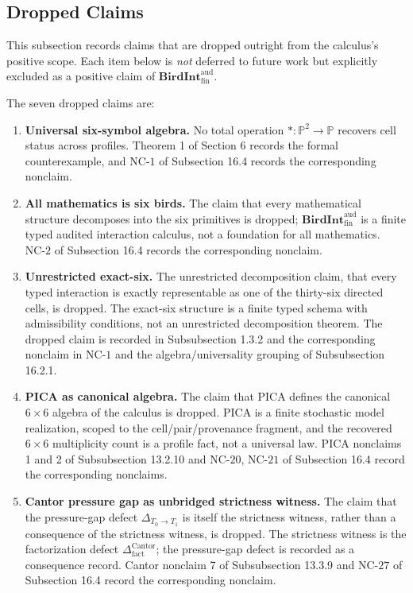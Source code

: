 \documentclass[11pt]{article}
\providecommand{\tightlist}{}
\theoremstyle{definition}
\begin{document}
\subsection{Dropped Claims}

This subsection records claims that are dropped outright from the calculus's positive scope. Each item below is \emph{not} deferred to future work but explicitly excluded as a positive claim of \(\mathbf{BirdInt}^{\mathrm{aud}}_{\mathrm{fin}}\).

The seven dropped claims are:

\begin{enumerate}
\def\labelenumi{\arabic{enumi}.}
\tightlist
\item
  \textbf{Universal six-symbol algebra.} No total operation \(\ast:\mathbb P^{2}\to\mathbb P\) recovers cell status across profiles. Theorem 1 of Section 6 records the formal counterexample, and \(\mathrm{NC}\text{-}1\) of Subsection 16.4 records the corresponding nonclaim.
\item
  \textbf{All mathematics is six birds.} The claim that every mathematical structure decomposes into the six primitives is dropped; \(\mathbf{BirdInt}^{\mathrm{aud}}_{\mathrm{fin}}\) is a finite typed audited interaction calculus, not a foundation for all mathematics. \(\mathrm{NC}\text{-}2\) of Subsection 16.4 records the corresponding nonclaim.
\item
  \textbf{Unrestricted exact-six.} The unrestricted decomposition claim, that every typed interaction is exactly representable as one of the thirty-six directed cells, is dropped. The exact-six structure is a finite typed schema with admissibility conditions, not an unrestricted decomposition theorem. The dropped claim is recorded in Subsubsection 1.3.2 and the corresponding nonclaim in \(\mathrm{NC}\text{-}1\) and the algebra/universality grouping of Subsubsection 16.2.1.
\item
  \textbf{PICA as canonical algebra.} The claim that PICA defines the canonical \(6\times 6\) algebra of the calculus is dropped. PICA is a finite stochastic model realization, scoped to the cell/pair/provenance fragment, and the recovered \(6\times 6\) multiplicity count is a profile fact, not a universal law. PICA nonclaims 1 and 2 of Subsubsection 13.2.10 and \(\mathrm{NC}\text{-}20\), \(\mathrm{NC}\text{-}21\) of Subsection 16.4 record the corresponding nonclaims.
\item
  \textbf{Cantor pressure gap as unbridged strictness witness.} The claim that the pressure-gap defect \(\Delta_{T_{0}\to T_{1}}\) is itself the strictness witness, rather than a consequence of the strictness witness, is dropped. The strictness witness is the factorization defect \(\Delta_{\mathrm{fact}}^{\mathrm{Cantor}}\); the pressure-gap defect is recorded as a consequence record. Cantor nonclaim 7 of Subsubsection 13.3.9 and \(\mathrm{NC}\text{-}27\) of Subsection 16.4 record the corresponding nonclaim.

\end{enumerate}
\end{document}

